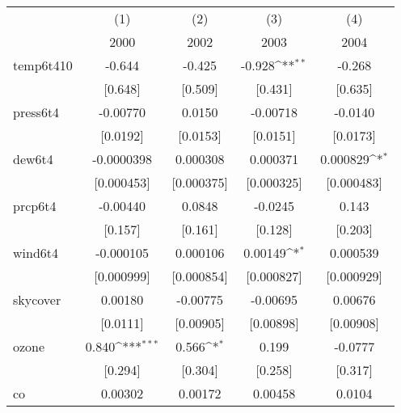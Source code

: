 {
\def\sym#1{\ifmmode^{#1}\else\(^{#1}\)\fi}
\begin{tabular}{l*{4}{c}}
\hline\hline
            &\multicolumn{1}{c}{(1)}&\multicolumn{1}{c}{(2)}&\multicolumn{1}{c}{(3)}&\multicolumn{1}{c}{(4)}\\
            &\multicolumn{1}{c}{2000}&\multicolumn{1}{c}{2002}&\multicolumn{1}{c}{2003}&\multicolumn{1}{c}{2004}\\
\hline
temp6t410   &      -0.644         &      -0.425         &      -0.928\sym{**} &      -0.268         \\
            &     [0.648]         &     [0.509]         &     [0.431]         &     [0.635]         \\
[1em]
press6t4    &    -0.00770         &      0.0150         &    -0.00718         &     -0.0140         \\
            &    [0.0192]         &    [0.0153]         &    [0.0151]         &    [0.0173]         \\
[1em]
dew6t4      &  -0.0000398         &    0.000308         &    0.000371         &    0.000829\sym{*}  \\
            &  [0.000453]         &  [0.000375]         &  [0.000325]         &  [0.000483]         \\
[1em]
prcp6t4     &    -0.00440         &      0.0848         &     -0.0245         &       0.143         \\
            &     [0.157]         &     [0.161]         &     [0.128]         &     [0.203]         \\
[1em]
wind6t4     &   -0.000105         &    0.000106         &     0.00149\sym{*}  &    0.000539         \\
            &  [0.000999]         &  [0.000854]         &  [0.000827]         &  [0.000929]         \\
[1em]
skycover    &     0.00180         &    -0.00775         &    -0.00695         &     0.00676         \\
            &    [0.0111]         &   [0.00905]         &   [0.00898]         &   [0.00908]         \\
[1em]
ozone       &       0.840\sym{***}&       0.566\sym{*}  &       0.199         &     -0.0777         \\
            &     [0.294]         &     [0.304]         &     [0.258]         &     [0.317]         \\
[1em]
co          &     0.00302         &     0.00172         &     0.00458         &      0.0104         \\

\end{tabular}}
